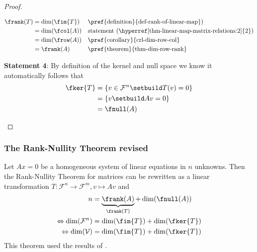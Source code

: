 \begin{proof}
\begin{flushleft}
\begin{align*}
			\frank(T) & =\dim(\fim{T})  &  & \text{\pref{definition}{def-rank-of-linear-map})}                  \\
			          & =\dim(\fcol(A)) &  & \text{statement (\hyperref[thm-linear-map-matrix-relations:2]{2})} \\
			          & =\dim(\frow(A)) &  & \text{\pref{corollary}{crl-dim-row-col}}                           \\
			          & =\frank(A)      &  & \text{\pref{theorem}{thm-dim-row-rank}}
		\end{align*}
	\end{flushleft}
	\begin{flushleft}
		\textbf{Statement 4}: By definition of the kernel and null space we know
		it automatically follows that
		\begin{align*}
			\fker{T} & =\left\{v\in\mathcal{F}^n\setbuild T(v)=0\right\} \\
			         & =\left\{v\setbuild Av=0\right\}                   \\
			         & =\fnull(A)
		\end{align*}
	\end{flushleft}
\end{proof}

\subsubsection{The Rank-Nullity Theorem revised}\label{subsec-rank-nullity-theorem-revised}

\begin{thm}\label{thm-rank-nullity-theorem-alt}
	Let $Ax=0$ be a homogeneous system of linear equations in $n$ unknowns.
	Then the Rank-Nullity Theorem for matrices can be rewritten as a linear
	transformation $T:\mathcal{F}^n\to\mathcal{F}^m,v\mapsto Av$ and
	\begin{align}
		n                                   & = \underbrace{\frank(A)}_{\frank(T)} + \dim(\fnull(A))\nonumber \\
		\Leftrightarrow \dim(\mathcal{F}^n) & = \dim(\fim{T}) + \dim(\fker{T})                                \\
		\Leftrightarrow \dim(\mathcal{V})   & = \dim(\fim{T}) + \dim(\fker{T})
	\end{align}
	This theorem used the results of .
\end{thm}

